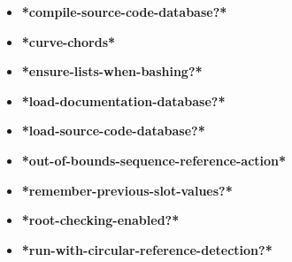 \documentclass [11pt]{book}
\begin{document}
\begin{itemize}
\item {}
\label{prim:*compile-source-code-database?*}
\textbf{*compile-source-code-database?*}





\item {}
\label{prim:*curve-chords*}
\textbf{*curve-chords*}





\item {}
\label{prim:*ensure-lists-when-bashing?*}
\textbf{*ensure-lists-when-bashing?*}





\item {}
\label{prim:*load-documentation-database?*}
\textbf{*load-documentation-database?*}





\item {}
\label{prim:*load-source-code-database?*}
\textbf{*load-source-code-database?*}





\item {}
\label{prim:*out-of-bounds-sequence-reference-action*}
\textbf{*out-of-bounds-sequence-reference-action*}





\item {}
\label{prim:*remember-previous-slot-values?*}
\textbf{*remember-previous-slot-values?*}





\item {}
\label{prim:*root-checking-enabled?*}
\textbf{*root-checking-enabled?*}





\item {}
\label{prim:*run-with-circular-reference-detection?*}
\textbf{*run-with-circular-reference-detection?*}






\end{itemize}
\end{document}
